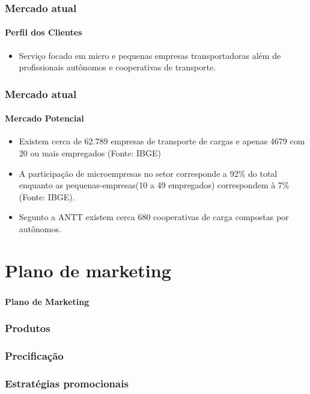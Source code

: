\documentclass{beamer}
\begin{document}
\begin{frame}
  \frametitle{Mercado atual}

  \framesubtitle{Perfil dos Clientes}
      \begin{itemize}
      \item Serviço focado em micro e pequenas empresas transportadoras além de profissionais autônomos e cooperativas de transporte.
      \end{itemize}
\end{frame}

\begin{frame}
  \frametitle{Mercado atual}
  \framesubtitle{Mercado Potencial}
      \begin{itemize}
      \item Existem cerca de 62.789 empresas de transporte de cargas e apenas 4679 com 20 ou mais empregados (Fonte: IBGE)
      \item A participação de microempresas no setor corresponde a 92\% do total enquanto as pequenas-empresas(10 a 49 empregados) correspondem à 7\%(Fonte: IBGE).
      \item Segunto a ANTT existem cerca 680 cooperativas de carga compostas por autônomos.
      \end{itemize}
\end{frame}
\section{Plano de marketing}

\begin{frame}
  \frametitle{}
  \framesubtitle{}

  \begin{center}
    {\huge\textbf{Plano de Marketing}}
  \end{center}
\end{frame}

\begin{frame}
  \frametitle{Produtos}
  \framesubtitle{}

\end{frame}

\begin{frame}
  \frametitle{Precificação}
  \framesubtitle{}

\end{frame}

\begin{frame}
  \frametitle{Estratégias promocionais}
  \framesubtitle{}

\end{frame}
\end{document}

